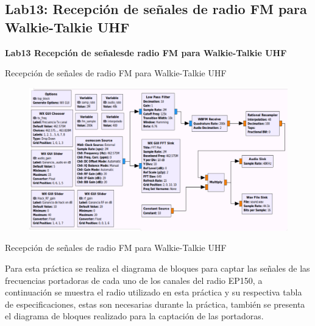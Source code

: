 \subsection{Lab13: Recepción de señales de radio FM para Walkie-Talkie UHF}
\begin{frame}{}



\bfseries{\textrm{\LARGE Lab13 \newline\Large Recepción de señales\newline  de radio FM para \newline Walkie-Talkie UHF}}
\raggedright
\end{frame}
\begin{frame}{Recepción de señales de radio FM para Walkie-Talkie UHF}


\begin{figure}[H]
\centering
\vspace{-3mm}
\includegraphics[width=\textwidth]{parte3/lab10/pdf/lab10_1.pdf}
\end{figure}

\end{frame}

\begin{frame}{Recepción de señales de radio FM para Walkie-Talkie UHF}


Para esta práctica se realiza el diagrama de bloques para captar las señales de las frecuencias portadoras de cada uno de los canales del radio EP150, a continuación se muestra el radio utilizado en esta práctica y su respectiva tabla de especificaciones, estas son necesarias durante la práctica, también se presenta el diagrama de bloques realizado para la captación de las portadoras.
    
\end{frame}

